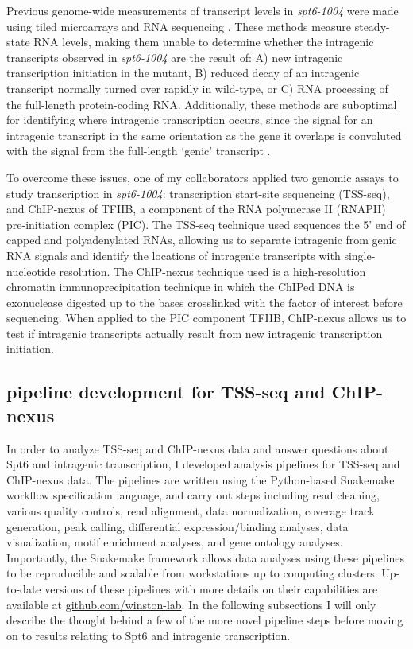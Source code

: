 \documentclass[11pt, a4paper]{article}
\begin{document}
Previous genome-wide measurements of transcript levels in \textit{spt6-1004} were made using tiled microarrays \cite{cheung2008} and RNA sequencing \cite{uwimana2017}. These methods measure steady-state RNA levels, making them unable to determine whether the intragenic transcripts observed in \textit{spt6-1004} are the result of: A) new intragenic transcription initiation in the mutant, B) reduced decay of an intragenic transcript normally turned over rapidly in wild-type, or C) RNA processing of the full-length protein-coding RNA. Additionally, these methods are suboptimal for identifying where intragenic transcription occurs, since the signal for an intragenic transcript in the same orientation as the gene it overlaps is convoluted with the signal from the full-length `genic' transcript \cite{cheung2008, lickwar2009}.

To overcome these issues, one of my collaborators applied two genomic assays to study transcription in \textit{spt6-1004}: transcription start-site sequencing (TSS-seq), and ChIP-nexus of TFIIB, a component of the RNA polymerase II (RNAPII) pre-initiation complex (PIC). The TSS-seq technique used sequences the 5' end of capped and polyadenylated RNAs, allowing us to separate intragenic from genic RNA signals and identify the locations of intragenic transcripts with single-nucleotide resolution. The ChIP-nexus technique used is a high-resolution chromatin immunoprecipitation technique in which the ChIPed DNA is exonuclease digested up to the bases crosslinked with the factor of interest before sequencing. When applied to the PIC component TFIIB, ChIP-nexus allows us to test if intragenic transcripts actually result from new intragenic transcription initiation.

\subsection{pipeline development for TSS-seq and ChIP-nexus}

In order to analyze TSS-seq and ChIP-nexus data and answer questions about Spt6 and intragenic transcription, I developed analysis pipelines for TSS-seq and ChIP-nexus data. The pipelines are written using the Python-based Snakemake workflow specification language, and carry out steps including read cleaning, various quality controls, read alignment, data normalization, coverage track generation, peak calling, differential expression/binding analyses, data visualization, motif enrichment analyses, and gene ontology analyses. Importantly, the Snakemake framework allows data analyses using these pipelines to be reproducible and scalable from workstations up to computing clusters. Up-to-date versions of these pipelines with more details on their capabilities are available at \href{https://github.com/winston-lab}{github.com/winston-lab}. In the following subsections I will only describe the thought behind a few of the more novel pipeline steps before moving on to results relating to Spt6 and intragenic transcription.
\end{document}
